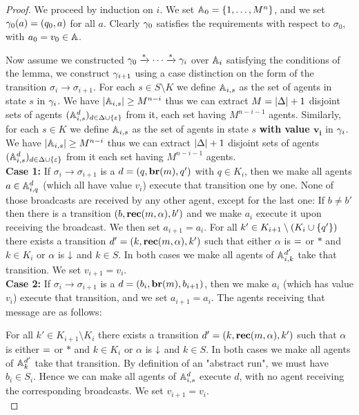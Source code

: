 \begin{proof}
	
	We proceed by induction on $i$.
	We set $\mathbb{A}_0 = \{1, \ldots, M^n\}$, and we set $\gamma_0(a) = (q_0, a)$ for all $a$. Clearly $\gamma_0$ satisfies the requirements with respect to $\sigma_0$, with $a_0 = v_0 \in \mathbb{A}$.
	
	Now assume we constructed $\gamma_0 \xrightarrow{*} \cdots \xrightarrow{*} \gamma_{i}$ over $\mathbb{A}_i$ satisfying the conditions of the lemma, we construct $\gamma_{i+1}$ using a case distinction on the form of the transition $\sigma_i \to \sigma_{i+1}$.
	For each $s \in S\setminus K$ we define $\mathbb{A}_{i,s}$ as the set of agents in state $s$ in $\gamma_{i}$. We have $|\mathbb{A}_{i,s}| \geq M^{n-i}$ thus we can extract $M = |\Delta|+1$ disjoint sets of agents $(\mathbb{A}_{i,s}^d)_{d \in \Delta\cup\{\varepsilon\}}$ from it, each set having $M^{n-i-1}$ agents.
	Similarly, for each $s \in K$ we define $\mathbb{A}_{i,s}$ as the set of agents in state $s$ \textbf{with value $\mathbf{v_i}$} in $\gamma_{i}$. We have $|\mathbb{A}_{i,s}| \geq M^{n-i}$ thus we can extract $|\Delta|+1$ disjoint sets of agents $(\mathbb{A}_{i,s}^d)_{d \in \Delta\cup\{\varepsilon\}}$ from it each set having $M^{n-i-1}$ agents.
	\\
	
	\textbf{Case 1: } If $\sigma_i \to \sigma_{i+1}$ is a  $d = (q, \textbf{br}(m), q')$ with $q \in K_i$, then we make all agents $a \in \mathbb{A}_{i,q}^{d}$ (which all have value $v_i$) execute that transition one by one.
	None of those broadcasts are received by any other agent, except for the last one:
	If $b \neq b'$ then there is a transition $(b, \textbf{rec}(m, \alpha), b')$ and we make $a_i$ execute it upon receiving the broadcast. We then set $a_{i+1} = a_i$.
	For all $k' \in K_{i+1} \setminus (K_i \cup \{q'\})$ there exists a transition $d'=(k, \textbf{rec}(m, \alpha), k')$ such that either $\alpha$ is ${=}$ or $*$ and $k \in K_i$ or $\alpha$ is $\downarrow$ and $k\in S$.
	In both cases we make all agents of $\mathbb{A}_{i,k}^{d'}$ take that transition.
	We set $v_{i+1} = v_i$.
	\\
	
	\textbf{Case 2: }If $\sigma_i \to \sigma_{i+1}$ is a  $d = (b_i, \textbf{br}(m), b_{i+1})$, then we make $a_i$ (which has value $v_i$) execute that transition, and we set $a_{i+1} = a_i$.
	The agents receiving that message are as follows:
	
	For all $k' \in K_{i+1} \setminus K_i $ there exists a transition $d'=(k, \textbf{rec}(m, \alpha), k')$ such that $\alpha$ is either ${=}$ or $*$ and $k \in K_i$ or $\alpha$ is $\downarrow$ and $k\in S$.
	In both cases we make all agents of $\mathbb{A}_k^{d'}$ take that transition.
	By definition of an "abstract run", we must have $b_i \in S_i$.
	Hence we can make all agents of $\mathbb{A}_{i,s}^{d}$ execute $d$, with no agent receiving the corresponding broadcasts.
	We set $v_{i+1} = v_i$.
	\\
	

\end{proof}
